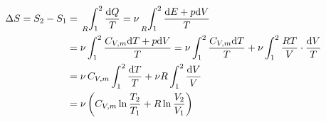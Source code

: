 \begin{equation*}
\begin{split}
\Delta S=S_2-S_1&=\sideset{_R}{}{\int_{1}^{2}}\frac{{\rm{d}} Q}{T}=\nu \sideset{_R}{}{\int_{1}^{2}}\frac{{\rm{d}} E + p{\rm{d}} V}{T}\\
&=\nu \int_{1}^{2}\frac{C_{V,m}{\rm{d}} T+ p{\rm{d}} V}{T}=\nu \int_{1}^{2}\frac{C_{V,m}{\rm{d}} T}{T}+\nu \int_{1}^{2}\frac{RT}{V}\cdot \frac{{\rm{d}} V}{T}\\
&=\nu \, C_{V,m} \int_{1}^{2}\frac{{\rm{d}} T}{T} + \nu R \int_{1}^{2}\frac{{\rm{d}} V}{V}\\
&=\nu \left(C_{V,m} \ln{\frac{T_2}{T_1}} +R \ln{\frac{V_2}{V_1}} \right) 
\end{split}
\end{equation*}




